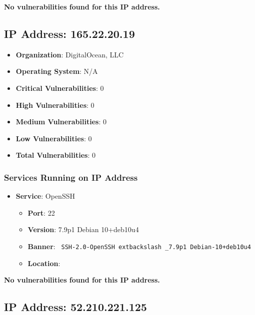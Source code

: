 \documentclass{article}
\begin{document}
\textbf{No vulnerabilities found for this IP address.}


\clearpage



\subsection*{IP Address: 165.22.20.19}

\begin{itemize}
    \item \textbf{Organization}: DigitalOcean, LLC
    \item \textbf{Operating System}:  N/A 
    \item \textbf{Critical Vulnerabilities}: 0
    \item \textbf{High Vulnerabilities}: 0
    \item \textbf{Medium Vulnerabilities}: 0
    \item \textbf{Low Vulnerabilities}: 0
    \item \textbf{Total Vulnerabilities}: 0
\end{itemize}

\subsubsection*{Services Running on IP Address}

\begin{itemize}
    
        \item \textbf{Service}: OpenSSH
        \begin{itemize}
            \item \textbf{Port}: 22
            \item \textbf{Version}:  7.9p1 Debian 10+deb10u4 
            \item \textbf{Banner}: \texttt{ SSH-2.0-OpenSSH	extbackslash _7.9p1 Debian-10+deb10u4 }
            \item \textbf{Location}: \href{  }{  }
        \end{itemize}
    
\end{itemize}


\textbf{No vulnerabilities found for this IP address.}


\clearpage



\subsection*{IP Address: 52.210.221.125}
\end{document}
